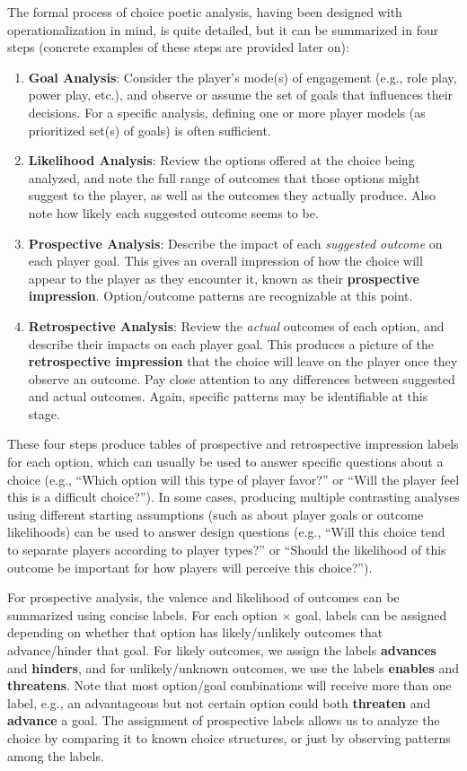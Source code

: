 \documentclass[arts,article,submit,moreauthors,pdftex,10pt,a4paper]{Definitions/mdpi}
\newcommand{\enables}{\textbf{\color{enables}enables}}
\newcommand{\advances}{\textbf{\color{advances}advances}}
\newcommand{\threatens}{\textbf{\color{threatens}threatens}}
\newcommand{\hinders}{\textbf{\color{hinders}hinders}}
\newcommand{\advancez}{\textbf{\color{advances}advance}}
\newcommand{\threatenz}{\textbf{\color{threatens}threaten}}
\begin{document}
\label{sec:analysis_steps}
The formal process of choice poetic analysis, having been designed with operationalization in mind, is quite detailed, but it can be summarized in four steps (concrete examples of these steps are provided later on):
\begin{enumerate}
  \item \textbf{Goal Analysis}: Consider the player's mode(s) of engagement (e.g., role play, power play, etc.), and observe or assume the set of goals that influences their decisions. For a specific analysis, defining one or more player models (as prioritized set(s) of goals) is often sufficient.
  \item \textbf{Likelihood Analysis}: Review the options offered at the choice being analyzed, and note the full range of outcomes that those options might suggest to the player, as well as the outcomes they actually produce. Also note how likely each suggested outcome seems to be.
  \item \textbf{Prospective Analysis}: Describe the impact of each \emph{suggested outcome} on each player goal. This gives an overall impression of how the choice will appear to the player as they encounter it, known as their \textbf{prospective impression}. Option/outcome patterns are recognizable at this point.
  \item \textbf{Retrospective Analysis}: Review the \emph{actual} outcomes of each option, and describe their impacts on each player goal. This produces a picture of the \textbf{retrospective impression} that the choice will leave on the player once they observe an outcome. Pay close attention to any differences between suggested and actual outcomes. Again, specific patterns may be identifiable at this stage.
\end{enumerate}
These four steps produce tables of prospective and retrospective impression labels for each option, which can usually be used to answer specific questions about a choice (e.g., ``Which option will this type of player favor?'' or ``Will the player feel this is a difficult choice?'').
%
In some cases, producing multiple contrasting analyses using different starting assumptions (such as about player goals or outcome likelihoods) can be used to answer design questions (e.g., ``Will this choice tend to separate players according to player types?'' or ``Should the likelihood of this outcome be important for how players will perceive this choice?'').

\label{sec:prospective_labels}

For prospective analysis, the valence and likelihood of outcomes can be summarized using concise labels.
%
For each option $\times$ goal, labels can be assigned depending on whether that option has likely/unlikely outcomes that advance/hinder that goal.
%
For likely outcomes, we assign the labels \advances{} and \hinders{}, and for unlikely/unknown outcomes, we use the labels \enables{} and \threatens{}.
%
Note that most option/goal combinations will receive more than one label, e.g., an advantageous but not certain option could both \threatenz{} and \advancez{} a goal.
%
The assignment of prospective labels allows us to analyze the choice by comparing it to known choice structures, or just by observing patterns among the labels.
\end{document}
